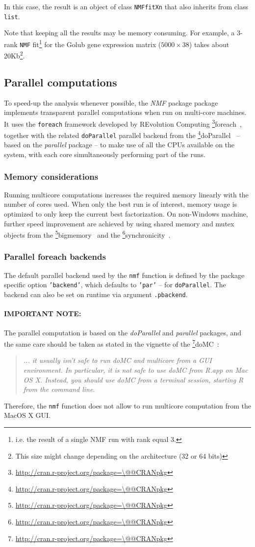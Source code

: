 \documentclass[a4paper]{article}\usepackage{graphicx, color}
\makeatletter
\let\code=\texttt
\newcommand{\pkgname}[1]{\textit{#1}\xspace}
\newcommand{\Rpkg}[1]{\pkgname{#1} package\xspace}
\newcommand{\CRANurl}[1]{\url{http://cran.r-project.org/package=#1}}
\def\CRANpkg{\@ifstar\@CRANpkg\@@CRANpkg}
\def\@CRANpkg#1{\href{http://cran.r-project.org/package=#1}{\pkgname{#1}}\footnote{\CRANurl{#1}}}
\def\@@CRANpkg#1{\href{http://cran.r-project.org/package=#1}{\pkgname{#1}} package\footnote{\CRANurl{#1}}}
\newcommand{\citeCRANpkg}[1]{\CRANpkg{#1}~\cite{#1}}
\newcommand{\nmfpack}{\Rpkg{NMF}}
\makeatother
\begin{document}
In this case, the result is an object of class \code{NMFfitXn} that also inherits from class \code{list}.

Note that keeping all the results may be memory consuming. 
For example, a 3-rank \code{NMF} fit\footnote{i.e. the result of a single NMF run with rank equal 3.} for the Golub gene expression matrix ($5000 \times 38$) takes about 20Kb\footnote{This size might change depending on the architecture (32 or 64 bits)}.

\subsection{Parallel computations}\label{multicore}

To speed-up the analysis whenever possible, the \nmfpack package implements transparent parallel computations when run on multi-core machines.
It uses the \code{foreach} framework developed by REvolution Computing
\citeCRANpkg{foreach}, together with the related \code{doParallel} parallel
backend from the \citeCRANpkg{doParallel} -- based on the
\pkgname{parallel} package -- to make use of all the CPUs available on the
system, with each core simultaneously performing part of the runs. 

\subsubsection{Memory considerations}
Running multicore computations increases the required memory linearly
with the number of cores used.
When only the best run is of interest, memory usage is
optimized to only keep the current best factorization.
On non-Windows machine, further speed improvement are achieved by using shared
memory and mutex objects from the \citeCRANpkg{bigmemory} and the 
\citeCRANpkg{synchronicity}.

\subsubsection{Parallel foreach backends}
The default parallel backend used by the \code{nmf} function is defined by the
package specific option \code{'backend'}, which defaults to \code{'par'} -- for
\code{doParallel}.
The backend can also be set on runtime via argument \code{.pbackend}.

\medskip
\paragraph{IMPORTANT NOTE:} 
The parallel computation is based on the \pkgname{doParallel} and
\pkgname{parallel} packages, and the same care should be taken as stated in the
vignette of the \citeCRANpkg{doMC}:
\begin{quote}
\emph{... it usually isn't safe to run doMC and multicore from a GUI environment. 
In particular, it is not safe to use doMC from R.app on Mac OS X. 
Instead, you should use doMC from a terminal session, starting R from the command line.}
\end{quote}
Therefore, the \code{nmf} function does not allow to run multicore computation from the 
MacOS X GUI.
\end{document}
